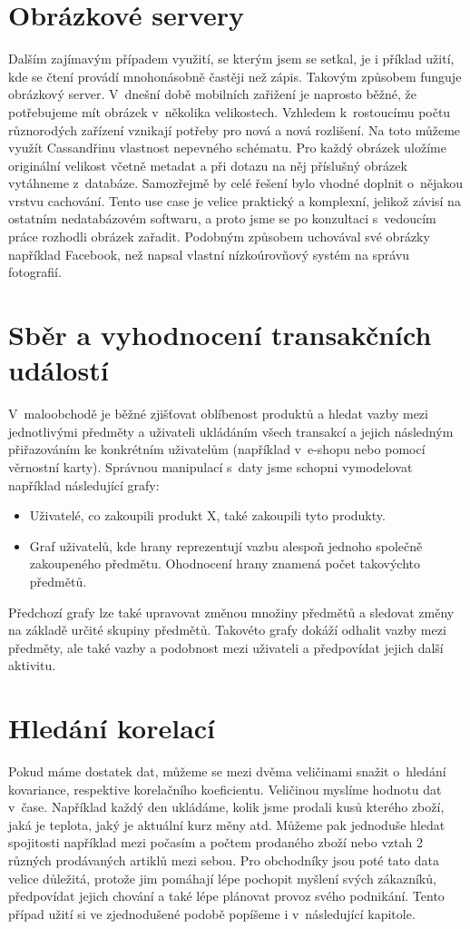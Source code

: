 \section{Obrázkové servery}
Dalším zajímavým případem využití, se kterým jsem se setkal, je i příklad užití, kde se čtení provádí mnohonásobně častěji než zápis. Takovým způsobem funguje obrázkový server. V~dnešní době mobilních zařižení je naprosto běžné, že potřebujeme mít obrázek v~několika velikostech. Vzhledem k~rostoucímu počtu různorodých zařízení vznikají potřeby pro nová a nová rozlišení. Na toto můžeme využít Cassandřinu vlastnost nepevného schématu. Pro každý obrázek uložíme originální velikost včetně metadat a při dotazu na něj příslušný obrázek vytáhneme z~databáze. Samozřejmě by celé řešení bylo vhodné doplnit o~nějakou vrstvu cachování. Tento use case je velice praktický a komplexní, jelikož závisí na ostatním nedatabázovém softwaru, a proto jsme se po konzultaci s~vedoucím práce rozhodli obrázek zařadit. Podobným způsobem uchovával své obrázky například Facebook, než napsal vlastní nízkoúrovňový systém na správu fotografií. 

\section{Sběr a vyhodnocení transakčních událostí}
V~maloobchodě je běžné zjišťovat oblíbenost produktů a hledat vazby mezi jednotlivými předměty a uživateli ukládáním všech transakcí a jejich následným přiřazováním ke konkrétním uživatelům (například v~e-shopu nebo pomocí věrnostní karty). Správnou manipulací s~daty jsme schopni vymodelovat například následující grafy:

\begin{itemize}
\item Uživatelé, co zakoupili produkt X, také zakoupili tyto produkty.
\item Graf uživatelů, kde hrany reprezentují vazbu alespoň jednoho společně zakoupeného předmětu. Ohodnocení hrany znamená počet takovýchto předmětů. 
\end{itemize} 
Předchozí grafy lze také upravovat změnou množiny předmětů a sledovat změny na základě určité skupiny předmětů. Takovéto grafy dokáží odhalit vazby mezi předměty, ale také vazby a podobnost mezi uživateli a předpovídat jejich další aktivitu. 
\newpage
\section{Hledání korelací}
Pokud máme dostatek dat, můžeme se mezi dvěma veličinami snažit o~hledání kovariance, respektive korelačního koeficientu. Veličinou myslíme hodnotu dat v~čase. Například každý den ukládáme, kolik jsme prodali kusů kterého zboží, jaká je teplota, jaký je aktuální kurz měny atd. Můžeme pak jednoduše hledat spojitosti například mezi počasím a počtem prodaného zboží nebo vztah 2 různých prodávaných artiklů mezi sebou. Pro obchodníky jsou poté tato data velice důležitá, protože jim pomáhají lépe pochopit myšlení svých zákazníků, předpovídat jejich chování a také lépe plánovat provoz svého podnikání. Tento případ užití si ve zjednodušené podobě popíšeme i v~následující kapitole. 

